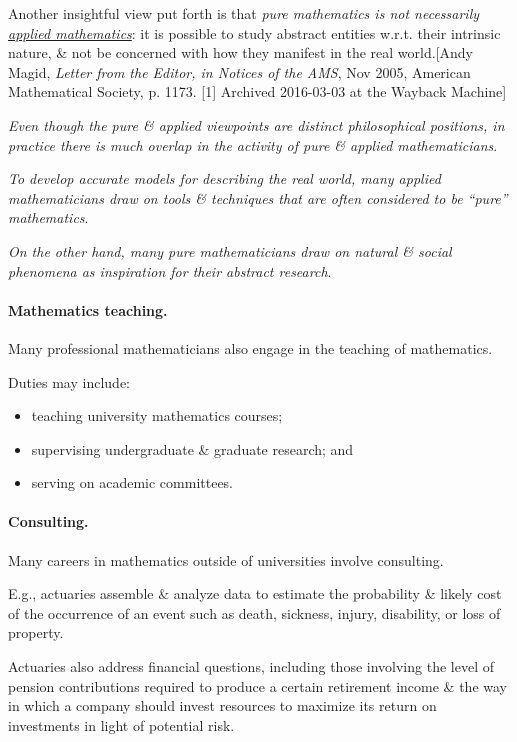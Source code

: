 \documentclass{article}
\begin{document}
%
Another insightful view put forth is that \textit{pure mathematics is not necessarily \href{https://en.wikipedia.org/wiki/Applied_mathematics}{applied mathematics}}: it is possible to study abstract entities w.r.t. their intrinsic nature, \& not be concerned with how they manifest in the real world.[Andy Magid, \textit{Letter from the Editor, in Notices of the AMS}, Nov 2005, American Mathematical Society, p. 1173. [1] Archived 2016-03-03 at the Wayback Machine]

\textit{Even though the pure \& applied viewpoints are distinct philosophical positions, in practice there is much overlap in the activity of pure \& applied mathematicians}.

%
\textit{To develop accurate models for describing the real world, many applied mathematicians draw on tools \& techniques that are often considered to be ``pure'' mathematics}.

\textit{On the other hand, many pure mathematicians draw on natural \& social phenomena as inspiration for their abstract research}.

\paragraph{Mathematics teaching.} Many professional mathematicians also engage in the teaching of mathematics.

Duties may include:
\begin{itemize}
	\item teaching university mathematics courses;
	\item supervising undergraduate \& graduate research; and
	\item serving on academic committees.
\end{itemize}

\paragraph{Consulting.} Many careers in mathematics outside of universities involve consulting.

E.g., actuaries assemble \& analyze data to estimate the probability \& likely cost of the occurrence of an event such as death, sickness, injury, disability, or loss of property.

Actuaries also address financial questions, including those involving the level of pension contributions required to produce a certain retirement income \& the way in which a company should invest resources to maximize its return on investments in light of potential risk.
\end{document}
